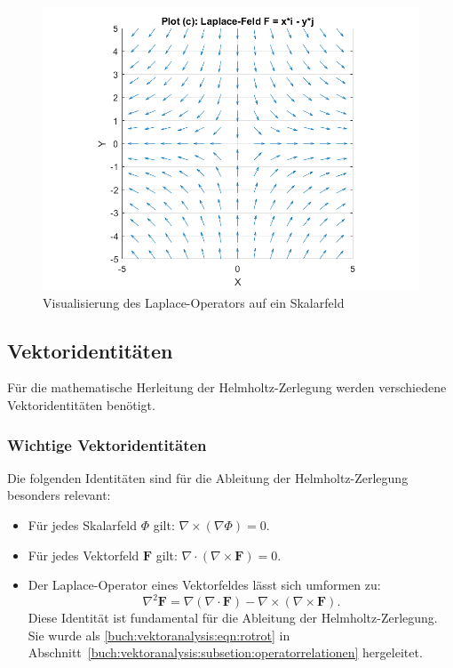 \begin{figure}
    \centering
    \includegraphics[scale=0.4]{papers/helmholtz/images/Laplace_Feld.png}
    \caption{Visualisierung des Laplace-Operators auf ein Skalarfeld}
    \label{fig:LaplaceAlg}
\end{figure}


\subsection{Vektoridentitäten
\label{helmholtz:subsection:Vektoridentitaeten}}
Für die mathematische Herleitung der Helmholtz-Zerlegung werden
verschiedene Vektoridentitäten benötigt.

\subsubsection{Wichtige Vektoridentitäten}

Die folgenden Identitäten sind für die Ableitung der Helmholtz-Zerlegung besonders relevant:

\begin{itemize}
\item Für jedes Skalarfeld $\Phi$ gilt: $\nabla \times (\nabla \Phi) = 0$.
\item Für jedes Vektorfeld $\boldsymbol{F}$ gilt: $\nabla \cdot (\nabla \times \boldsymbol{F}) = 0$.
\item Der Laplace-Operator eines Vektorfeldes lässt sich umformen zu:
\begin{equation}
\nabla^2 \boldsymbol{F} = \nabla(\nabla \cdot \boldsymbol{F}) - \nabla \times (\nabla \times \boldsymbol{F}).
\end{equation}
Diese Identität ist fundamental für die Ableitung der Helmholtz-Zerlegung.
Sie wurde als \eqref{buch:vektoranalysis:eqn:rotrot} in
Abschnitt~\ref{buch:vektoranalysis:subsetion:operatorrelationen} hergeleitet.
\end{itemize}




